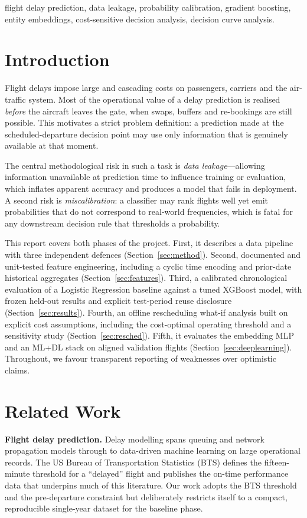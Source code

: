 \documentclass[conference]{IEEEtran}
\begin{document}
\begin{IEEEkeywords}
flight delay prediction, data leakage, probability calibration, gradient
boosting, entity embeddings, cost-sensitive decision analysis, decision curve
analysis.
\end{IEEEkeywords}

\section{Introduction}
Flight delays impose large and cascading costs on passengers, carriers and the
air-traffic system. Most of the operational value of a delay prediction is
realised \emph{before} the aircraft leaves the gate, when swaps, buffers and
re-bookings are still possible. This motivates a strict problem definition: a
prediction made at the scheduled-departure decision point may use only
information that is genuinely available at that moment.

The central methodological risk in such a task is \emph{data leakage}---allowing
information unavailable at prediction time to influence training or evaluation,
which inflates apparent accuracy and produces a model that fails in deployment.
A second risk is \emph{miscalibration}: a classifier may rank flights well yet
emit probabilities that do not correspond to real-world frequencies, which is
fatal for any downstream decision rule that thresholds a probability.

This report covers both phases of the project. First, it describes a data
pipeline with three independent
defences (Section~\ref{sec:method}). Second, documented and unit-tested feature
engineering, including a cyclic time encoding and prior-date historical
aggregates (Section~\ref{sec:features}). Third, a calibrated chronological
evaluation of a Logistic Regression baseline against a tuned XGBoost model,
with frozen held-out results and explicit test-period reuse disclosure
(Section~\ref{sec:results}). Fourth, an offline
rescheduling what-if analysis built on explicit cost assumptions, including the
cost-optimal operating threshold and a sensitivity study
(Section~\ref{sec:resched}). Fifth, it evaluates the embedding MLP and an
ML+DL stack on aligned validation flights (Section~\ref{sec:deeplearning}).
Throughout, we favour transparent reporting of
weaknesses over optimistic claims.

\section{Related Work}
\label{sec:related}
\textbf{Flight delay prediction.} Delay modelling spans queuing and network
propagation models through to data-driven machine learning on
large operational records. The US Bureau of Transportation Statistics
(BTS) defines the fifteen-minute threshold for a ``delayed'' flight and publishes
the on-time performance data that underpins much of this
literature. Our work adopts the BTS threshold and the pre-departure
constraint but deliberately restricts itself to a compact, reproducible
single-year dataset for the baseline phase.
\end{document}
